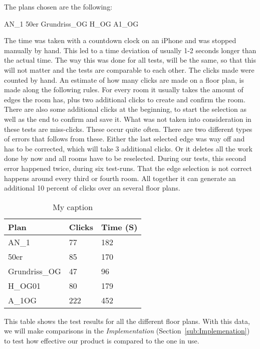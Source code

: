 The plans chosen are the following:

AN\_1
50er
Grundriss\_OG
H\_OG
A1\_OG


The time was taken with a countdown clock on an iPhone and was stopped manually by hand. This led to a time deviation of usually 1-2 seconds longer than the actual time. The way this was done for all tests, will be the same, so that this will not matter and the tests are comparable to each other. The clicks made were counted by hand.
An estimate of how many clicks are made on a floor plan, is made along the following rules. For every room it usually takes the amount of edges the room has, plus two additional clicks to create and confirm the room. There are also some additional clicks at the beginning, to start the selection as well as the end to confirm and save it.
What was not taken into consideration in these tests are miss-clicks. These occur quite often. There are two different types of errors that follows from these. Either the last selected edge was way off and has to be corrected, which will take 3 additional clicks. Or it deletes all the work done by now and all rooms have to be reselected. During our tests, this second error happened twice, during six test-runs. That the edge selection is not correct happens around every third or fourth room. All together it can generate an additional 10 percent of clicks over an several floor plans.


\begin{table}[]
	\centering
	\caption{My caption}
	\label{my-label}
	\begin{tabular}{@{}lll@{}}
		\toprule
		Plan          & Clicks & Time (S) \\ \midrule
		AN\_1         & 77     & 182 \\
		50er          & 85     & 170  \\
		Grundriss\_OG & 47     & 96 \\
		H\_OG01         & 80     & 179 \\
		A\_1OG        & 222    & 452 \\ \bottomrule
	\end{tabular}
\end{table}

This table shows the test results for all the different floor plans. With this data, we will make comparisons in the \textit{Implementation} (Section~\ref{sub:Implemenation}) to test how effective our product is compared to the one in use.

